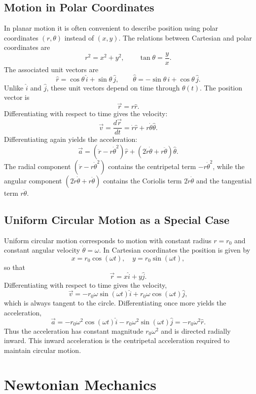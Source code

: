\documentclass{article}
\begin{document}
\subsection{Motion in Polar Coordinates}
In planar motion it is often convenient to describe position using polar coordinates $(r,\theta)$ instead of $(x,y)$. The relations between Cartesian and polar coordinates are
\[r^2 = x^2 + y^2, \qquad \tan\theta = \frac{y}{x}.\]
The associated unit vectors are
\[\hat{r} = \cos\theta\,\hat{i} + \sin\theta\,\hat{j}, \qquad \hat{\theta} = -\sin\theta\,\hat{i} + \cos\theta\,\hat{j}.\]
Unlike $\hat{i}$ and $\hat{j}$, these unit vectors depend on time through $\theta(t)$. The position vector is
\[\vec{r} = r \hat{r}.\]
Differentiating with respect to time gives the velocity:
\[\vec{v} = \frac{d\vec{r}}{dt} = \dot{r}\hat{r} + r\dot{\theta}\hat{\theta}.\]
Differentiating again yields the acceleration:
\[\vec{a} = (\ddot{r} - r\dot{\theta}^2)\hat{r} + (2\dot{r}\dot{\theta} + r\ddot{\theta})\hat{\theta}.\]
The radial component $(\ddot{r} - r\dot{\theta}^2)$ contains the centripetal term $-r\dot{\theta}^2$, while the angular component $(2\dot{r}\dot{\theta} + r\ddot{\theta})$ contains the Coriolis term $2\dot{r}\dot{\theta}$ and the tangential term $r\ddot{\theta}$.

\subsection{Uniform Circular Motion as a Special Case}
Uniform circular motion corresponds to motion with constant radius $r = r_0$ and constant angular velocity $\dot{\theta} = \omega$. In Cartesian coordinates the position is given by \[x = r_0 \cos(\omega t), \quad y = r_0 \sin(\omega t),\] so that \[\vec{r} = x\hat{i} + y\hat{j}.\]
Differentiating with respect to time gives the velocity, \[\vec{v} = -r_0 \omega \sin(\omega t)\hat{i} + r_0 \omega \cos(\omega t)\hat{j},\] which is always tangent to the circle.
Differentiating once more yields the acceleration, \[\vec{a} = -r_0 \omega^2 \cos(\omega t)\hat{i} - r_0 \omega^2 \sin(\omega t)\hat{j} = -r_0 \omega^2 \hat{r}.\]
Thus the acceleration has constant magnitude $r_0\omega^2$ and is directed radially inward. This inward acceleration is the centripetal acceleration required to maintain circular motion.



\section{Newtonian Mechanics}
\end{document}
